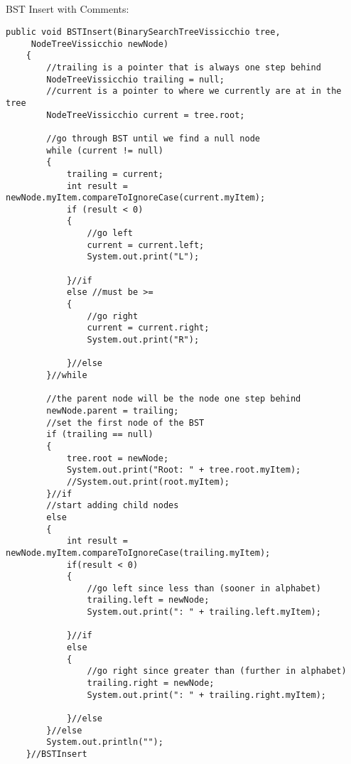 \documentclass[letterpaper, 10pt]{article}
\begin{document}
\subsection{}
BST Insert with Comments:\\
\begin{lstlisting}
public void BSTInsert(BinarySearchTreeVissicchio tree,
     NodeTreeVissicchio newNode)
    {
        //trailing is a pointer that is always one step behind
        NodeTreeVissicchio trailing = null;
        //current is a pointer to where we currently are at in the tree
        NodeTreeVissicchio current = tree.root;

        //go through BST until we find a null node
        while (current != null)
        {
            trailing = current;
            int result = newNode.myItem.compareToIgnoreCase(current.myItem);
            if (result < 0)
            {
                //go left
                current = current.left;
                System.out.print("L");
                
            }//if
            else //must be >=
            {
                //go right
                current = current.right;
                System.out.print("R");
                
            }//else
        }//while

        //the parent node will be the node one step behind
        newNode.parent = trailing;
        //set the first node of the BST
        if (trailing == null)
        {
            tree.root = newNode;
            System.out.print("Root: " + tree.root.myItem);
            //System.out.print(root.myItem);
        }//if
        //start adding child nodes
        else
        {
            int result = newNode.myItem.compareToIgnoreCase(trailing.myItem);
            if(result < 0)
            {
                //go left since less than (sooner in alphabet)
                trailing.left = newNode;
                System.out.print(": " + trailing.left.myItem);
                
            }//if
            else
            {
                //go right since greater than (further in alphabet)
                trailing.right = newNode;
                System.out.print(": " + trailing.right.myItem);
                
            }//else
        }//else
        System.out.println("");
    }//BSTInsert
\end{lstlisting}
\end{document}
